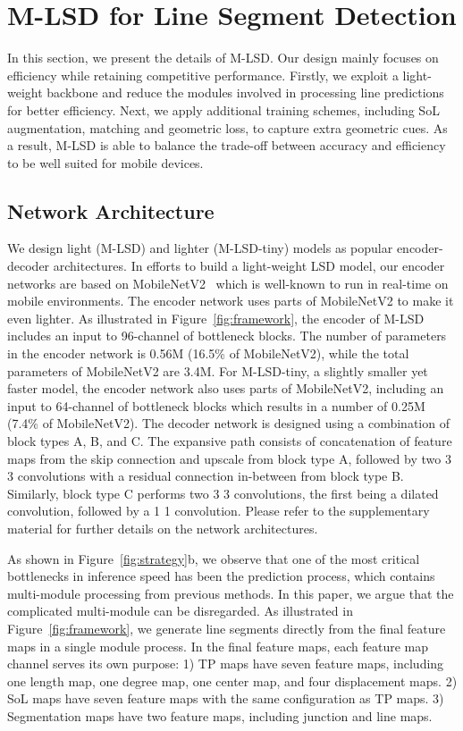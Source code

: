 \documentclass[letterpaper]{article} \usepackage{aaai22}  \usepackage{times}  \usepackage{helvet}  \usepackage{courier}  \usepackage[hyphens]{url}  \usepackage{graphicx} \urlstyle{rm} \def\UrlFont{\rm}  \usepackage{natbib}  \usepackage{caption} \DeclareCaptionStyle{ruled}{labelfont=normalfont,labelsep=colon,strut=off} \frenchspacing  \setlength{\pdfpagewidth}{8.5in}  \setlength{\pdfpageheight}{11in}  \usepackage{algorithm}
\begin{document}
\section{M-LSD for Line Segment Detection}
In this section, we present the details of M-LSD.
Our design mainly focuses on efficiency while retaining competitive performance.
Firstly, we exploit a light-weight backbone and reduce the modules involved in processing line predictions for better efficiency.
Next, we apply additional training schemes, including SoL augmentation, matching and geometric loss, to capture extra geometric cues.
As a result, M-LSD is able to balance the trade-off between accuracy and efficiency to be well suited for mobile devices.

\subsection{Network Architecture}

We design light (M-LSD) and lighter (M-LSD-tiny) models as popular encoder-decoder architectures.
In efforts to build a light-weight LSD model, our encoder networks are based on MobileNetV2~\cite{sandler2018mobilenetv2} which is well-known to run in real-time on mobile environments.
The encoder network uses parts of MobileNetV2 to make it even lighter.
As illustrated in Figure~\ref{fig:framework}, the encoder of M-LSD includes an input to 96-channel of bottleneck blocks.
The number of parameters in the encoder network is 0.56M (16.5\% of MobileNetV2), while the total parameters of MobileNetV2 are 3.4M.
For M-LSD-tiny, a slightly smaller yet faster model, the encoder network also uses parts of MobileNetV2, including an input to 64-channel of bottleneck blocks which results in a number of 0.25M (7.4\% of MobileNetV2).
The decoder network is designed using a combination of block types A, B, and C.
The expansive path consists of concatenation of feature maps from the skip connection and upscale from block type A, followed by two 3  3 convolutions with a residual connection in-between from block type B.
Similarly, block type C performs two 3  3 convolutions, the first being a dilated convolution, followed by a 1  1 convolution.
Please refer to the supplementary material for further details on the network architectures.

As shown in Figure~\ref{fig:strategy}b, we observe that one of the most critical bottlenecks in inference speed has been the prediction process, which contains multi-module processing from previous methods.
In this paper, we argue that the complicated multi-module can be disregarded.
As illustrated in Figure~\ref{fig:framework}, we generate line segments directly from the final feature maps in a single module process.
In the final feature maps, each feature map channel serves its own purpose:
1) TP maps have seven feature maps, including one length map, one degree map, one center map, and four displacement maps.
2) SoL maps have seven feature maps with the same configuration as TP maps.
3) Segmentation maps have two feature maps, including junction and line maps.
\end{document}

